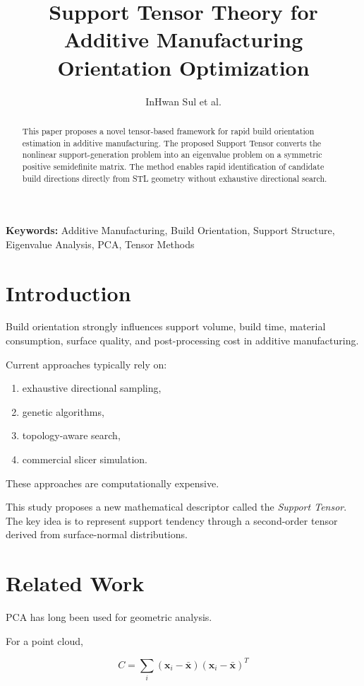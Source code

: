 \documentclass[journal,11pt]{article}
\title{Support Tensor Theory for Additive Manufacturing Orientation Optimization}
\author{InHwan Sul et al.}
\date{}
\begin{document}
\maketitle

\begin{abstract}
This paper proposes a novel tensor-based framework for rapid build orientation estimation in additive manufacturing.
The proposed Support Tensor converts the nonlinear support-generation problem into an eigenvalue problem on a symmetric positive semidefinite matrix.
The method enables rapid identification of candidate build directions directly from STL geometry without exhaustive directional search.
\end{abstract}

\textbf{Keywords:}
Additive Manufacturing, Build Orientation, Support Structure, Eigenvalue Analysis, PCA, Tensor Methods

\section{Introduction}

Build orientation strongly influences support volume, build time, material consumption, surface quality, and post-processing cost in additive manufacturing.

Current approaches typically rely on:

\begin{enumerate}
\item exhaustive directional sampling,
\item genetic algorithms,
\item topology-aware search,
\item commercial slicer simulation.
\end{enumerate}

These approaches are computationally expensive.

This study proposes a new mathematical descriptor called the \emph{Support Tensor}.
The key idea is to represent support tendency through a second-order tensor derived from surface-normal distributions.

\section{Related Work}

PCA has long been used for geometric analysis.

For a point cloud,

\begin{equation}
C=\sum_i (\mathbf{x}_i-\bar{\mathbf{x}})(\mathbf{x}_i-\bar{\mathbf{x}})^T
\end{equation}
\end{document}
